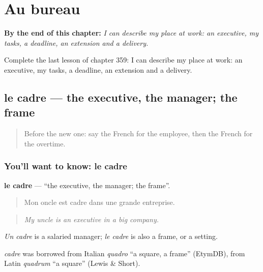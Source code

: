 
\chapter{Au bureau}
\label{ch:fr-au-bureau}

\begin{chapteropening}
\textbf{By the end of this chapter:} \emph{I can describe my place at work: an executive, my tasks, a deadline, an extension and a delivery.}

Complete the last lesson of chapter 359: I can describe my place at work: an executive, my tasks, a deadline, an extension and a delivery.
\end{chapteropening}

\section[le cadre]{le cadre — the executive, the manager; the frame}

\label{lesson:FR-C359-cadre}



\begin{quote}
Before the new one: say the French for the employee, then the French for the overtime.
\end{quote}

\subsection*{You'll want to know: le cadre}
\textbf{le cadre} — \textquotedblleft{}the executive, the manager; the frame\textquotedblright{}.

\begin{quote}
Mon oncle est cadre dans une grande entreprise.
\end{quote}

\begin{quote}
\emph{My uncle is an executive in a big company.}
\end{quote}

\emph{Un cadre} is a salaried manager; \emph{le cadre} is also a frame, or a setting.

\begin{cousinweb}
\emph{cadre} was borrowed from Italian \emph{quadro} \textquotedblleft{}a square, a frame\textquotedblright{} (EtymDB), from Latin \emph{quadrum} \textquotedblleft{}a square\textquotedblright{} (Lewis \& Short).
\end{cousinweb}

